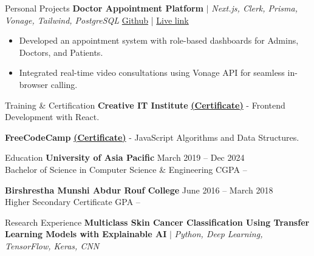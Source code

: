 \documentclass{resume} %
\begin{document}
{\begin{rSection}{Personal Projects}
{\textbf{Doctor Appointment Platform}} $|$ \emph{Next.js, Clerk, Prisma, Vonage, Tailwind, PostgreSQL}
\hfill{\href{https://github.com/smRid/Doctors-Appointment-Platform}{Github}} | {\href{https://medimeet-smr.vercel.app/}{Live link}}
    \vspace{-0.2cm}
    \begin{itemize}[leftmargin=0.4cm, label={\Large \textbullet}]
    \justifying
        \setlength\itemsep{-0.2cm}
        \item Developed an appointment system with role-based dashboards for Admins, Doctors, and Patients.
        \item Integrated real-time video consultations using Vonage API for seamless in-browser calling.
    \end{itemize}

\end{rSection}
\vspace{-0.18cm}

\vspace{-0.18cm}
\begin{rSection}{Training \& Certification}
    {\bf Creative IT Institute} \href{https://certificate.citsmp.com/?certificate_id=REACT-23101312}{\textbf{(Certificate)}} - Frontend Development with React.

    {\bf FreeCodeCamp} \href{https://www.freecodecamp.org/certification/smRid/javascript-algorithms-and-data-structures-v8}{\textbf{(Certificate)}} - JavaScript Algorithms and Data Structures.
\end{rSection}
\vspace{-0.18cm}

\vspace{-0.18cm}
\begin{rSection}{Education}
    {\bf University of Asia Pacific} \hfill {March 2019 -- Dec 2024} \\
    Bachelor of Science in Computer Science \& Engineering \hfill {CGPA --}

    {\bf Birshrestha Munshi Abdur Rouf College} \hfill {June 2016 -- March 2018} \\
    Higher Secondary Certificate \hfill {GPA --}
\end{rSection}
\vspace{-0.18cm}

\vspace{-0.18cm}
\begin{rSection}{Research Experience}
{\textbf{Multiclass Skin Cancer Classification Using Transfer Learning Models with Explainable AI}} $|$ \emph{Python, Deep Learning, TensorFlow, Keras, CNN}
\end{rSection}

}
\end{document}
